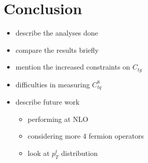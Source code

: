 \documentclass[a4paper,11pt]{article}
\begin{document}
\section{Conclusion}
\begin{itemize}
    \item describe the analyses done
    \item compare the results briefly
    \item mention the increased constraints on $C_{tg}$
    \item difficulties in measuring $C_{tq}^{8}$
    \item describe future work
    \begin{itemize}
        \item performing at NLO
        \item considering more 4 fermion operators
        \item look at $p_{T}^{t}$ distribution
    \end{itemize}
\end{itemize}

\clearpage
\begingroup
\raggedright{}
\sloppy
\printbibliography{}
\endgroup
\end{document}
